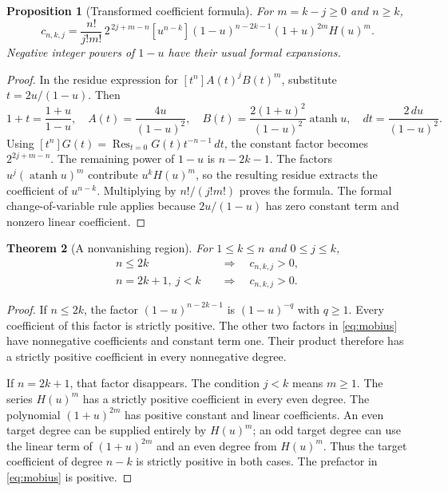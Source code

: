 \documentclass[11pt]{article}
\numberwithin{equation}{section}
\newtheorem{theorem}{Theorem}[section]
\newtheorem{proposition}[theorem]{Proposition}
\theoremstyle{definition}
\theoremstyle{remark}
\DeclareMathOperator{\Res}{Res}
\DeclareMathOperator{\atanh}{atanh}
\begin{document}
\begin{proposition}[Transformed coefficient formula]\label{prop:mobius}
For $m=k-j\ge0$ and $n\ge k$,
\begin{equation}\label{eq:mobius}
 c_{n,k,j}=\frac{n!}{j!m!}\,2^{\,2j+m-n}
 [u^{n-k}](1-u)^{n-2k-1}(1+u)^{2m}H(u)^m.
\end{equation}
Negative integer powers of $1-u$ have their usual formal expansions.
\end{proposition}
\begin{proof}
In the residue expression for $[t^n]A(t)^jB(t)^m$, substitute
$t=2u/(1-u)$. Then
\[
 1+t=\frac{1+u}{1-u},\quad
 A(t)=\frac{4u}{(1-u)^2},\quad
 B(t)=\frac{2(1+u)^2}{(1-u)^2}\atanh u,
 \quad dt=\frac{2\,du}{(1-u)^2}.
\]
Using $[t^n]G(t)=\Res_{t=0}G(t)t^{-n-1}\,dt$, the constant factor becomes
$2^{2j+m-n}$. The remaining power of $1-u$ is $n-2k-1$.
The factors $u^j(\atanh u)^m$ contribute $u^kH(u)^m$, so the resulting
residue extracts the coefficient of $u^{n-k}$. Multiplying by
$n!/(j!m!)$ proves the formula. The formal change-of-variable rule applies
because $2u/(1-u)$ has zero constant term and nonzero linear coefficient.
\end{proof}

\begin{theorem}[A nonvanishing region]\label{thm:positive}
For $1\le k\le n$ and $0\le j\le k$,
\begin{equation}\label{eq:positive}
 \begin{split}
 n\le2k&\quad\Longrightarrow\quad c_{n,k,j}>0,\\
 n=2k+1,\ j<k&\quad\Longrightarrow\quad c_{n,k,j}>0.
 \end{split}
\end{equation}
\end{theorem}
\begin{proof}
If $n\le2k$, the factor $(1-u)^{n-2k-1}$ is $(1-u)^{-q}$ with $q\ge1$.
Every coefficient of this factor is strictly positive. The other two
factors in \eqref{eq:mobius} have nonnegative coefficients and constant
term one. Their product therefore has a strictly positive coefficient in
every nonnegative degree.

If $n=2k+1$, that factor disappears. The condition $j<k$ means $m\ge1$.
The series $H(u)^m$ has a strictly positive coefficient in every even
degree. The polynomial $(1+u)^{2m}$ has positive constant and linear
coefficients. An even target degree can be supplied entirely by $H(u)^m$;
an odd target degree can use the linear term of $(1+u)^{2m}$ and an even
degree from $H(u)^m$. Thus the target coefficient of degree $n-k$ is
strictly positive in both cases. The prefactor in \eqref{eq:mobius} is
positive.
\end{proof}
\end{document}
